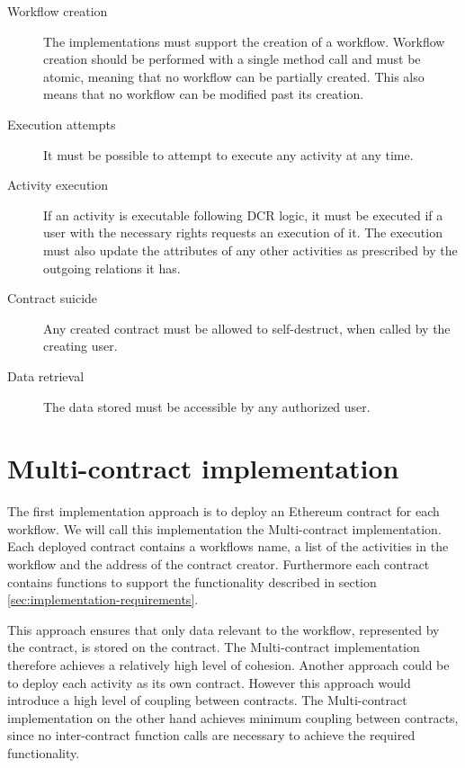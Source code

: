 \documentclass{article}
\begin{document}
	\begin{description}
		\item[Workflow creation] The implementations must support the creation of a workflow. Workflow creation should be performed with a single method call and must be atomic, meaning that no workflow can be partially created. This also means that no workflow can be modified past its creation.
		\item[Execution attempts] It must be possible to attempt to execute any activity at any time.
		\item[Activity execution] If an activity is executable following DCR logic, it must be executed if a user with the necessary rights requests an execution of it. The execution must also update the attributes of any other activities as prescribed by the outgoing relations it has.
		\item[Contract suicide] Any created contract must be allowed to self-destruct, when called by the creating user.
		\item[Data retrieval] The data stored must be accessible by any authorized user.
	\end{description}

	\section{Multi-contract implementation}

	The first implementation approach is to deploy an Ethereum contract for each workflow. We will call this implementation the Multi-contract implementation.
	Each deployed contract contains a workflows name, a list of the activities in the workflow and the address of the contract creator.
	Furthermore each contract contains functions to support the functionality described in section \ref{sec:implementation-requirements}.

	This approach ensures that only data relevant to the workflow, represented by the contract, is stored on the contract. The Multi-contract implementation therefore achieves a relatively high level of cohesion.
	Another approach could be to deploy each activity as its own contract.
	However this approach would introduce a high level of coupling between contracts.
	The Multi-contract implementation on the other hand achieves minimum coupling between contracts, since no inter-contract function calls are necessary to achieve the required functionality.

\end{document}
